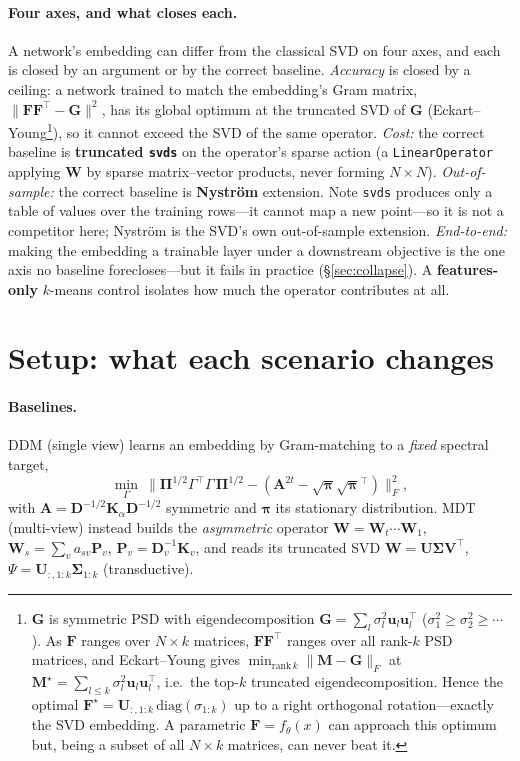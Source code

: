 \documentclass[10pt,twocolumn]{article}
\newcommand{\W}{\mathbf{W}}
\newcommand{\A}{\mathbf{A}}
\newcommand{\Pii}{\boldsymbol{\Pi}}
\newcommand{\bp}{\boldsymbol{\pi}}
\begin{document}
\paragraph{Four axes, and what closes each.}
A network's embedding can differ from the classical SVD on four axes, and each is closed by an
argument or by the correct baseline.
\emph{Accuracy} is closed by a ceiling: a network trained to match the embedding's Gram matrix,
$\lVert \mathbf{F}\mathbf{F}^\top - \mathbf{G}\rVert^2$, has its global optimum at the truncated SVD
of $\mathbf{G}$ (Eckart--Young\footnote{$\mathbf{G}$ is symmetric PSD with eigendecomposition
$\mathbf{G}=\sum_l\sigma_l^2\mathbf u_l\mathbf u_l^\top$ ($\sigma_1^2\!\ge\!\sigma_2^2\!\ge\!\cdots$). As
$\mathbf{F}$ ranges over $N\times k$ matrices, $\mathbf{F}\mathbf{F}^\top$ ranges over all rank-$k$ PSD
matrices, and Eckart--Young gives $\min_{\mathrm{rank}\,k}\lVert \mathbf{M}-\mathbf{G}\rVert_F$ at
$\mathbf{M}^\star=\sum_{l\le k}\sigma_l^2\mathbf u_l\mathbf u_l^\top$, i.e.\ the top-$k$ truncated
eigendecomposition. Hence the optimal $\mathbf{F}^\star=\mathbf U_{:,1:k}\,\mathrm{diag}(\sigma_{1:k})$
up to a right orthogonal rotation---exactly the SVD embedding. A parametric $\mathbf F=f_\theta(x)$ can
approach this optimum but, being a subset of all $N\times k$ matrices, can never beat it.}), so it
cannot exceed the SVD of the same operator.
\emph{Cost:} the correct baseline is \textbf{truncated \texttt{svds}} on the operator's sparse action
(a \texttt{LinearOperator} applying $\W$ by sparse matrix--vector products, never forming $N\times N$).
\emph{Out-of-sample:} the correct baseline is \textbf{Nystr\"om} extension. Note \texttt{svds} produces
only a table of values over the training rows---it cannot map a new point---so it is not a competitor
here; Nystr\"om is the SVD's own out-of-sample extension.
\emph{End-to-end:} making the embedding a trainable layer under a downstream objective is the one axis
no baseline forecloses---but it fails in practice (\S\ref{sec:collapse}).
A \textbf{features-only} $k$-means control isolates how much the operator contributes at all.

\section{Setup: what each scenario changes}
\paragraph{Baselines.}
DDM (single view) learns an embedding by Gram-matching to a \emph{fixed} spectral target,
\begin{equation}
\min_{\Gamma}\ \big\lVert \Pii^{1/2}\Gamma^\top\!\Gamma\,\Pii^{1/2}
-(\A^{2t}-\sqrt{\bp}\sqrt{\bp}^\top)\big\rVert_F^2,
\end{equation}
with $\A=\mathbf D^{-1/2}\mathbf K_\alpha\mathbf D^{-1/2}$ symmetric and $\bp$ its stationary
distribution. MDT (multi-view) instead builds the \emph{asymmetric} operator $\W=\W_t\cdots\W_1$,
$\W_s=\sum_v a_{sv}\mathbf P_v$, $\mathbf P_v=\mathbf D_v^{-1}\mathbf K_v$, and reads its truncated SVD
$\W=\mathbf U\boldsymbol\Sigma\mathbf V^\top$, $\Psi=\mathbf U_{:,1:k}\boldsymbol\Sigma_{1:k}$
(transductive).
\end{document}
